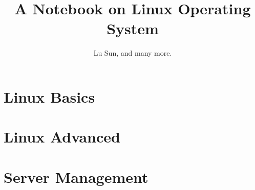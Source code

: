 



\makeindex



\frontmatter

\title{A Notebook on Linux Operating System}
\author{Lu Sun, and many more.}

\maketitle


\tableofcontents


\listoffigures
\listoftables

\mainmatter

\part{Linux Basics}















\part{Linux Advanced}









\part{Server Management}

